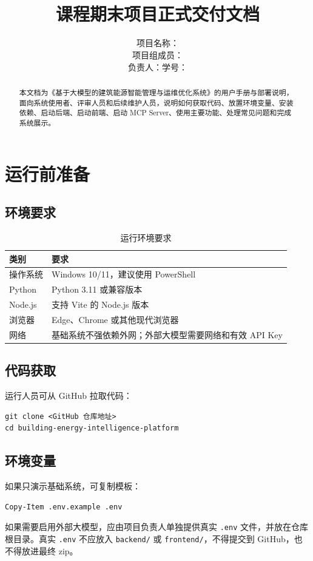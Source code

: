 \documentclass[12pt,a4paper]{ctexart}
\title{
    \vspace{-2em}
    \heiti \zihao{2} \reporttitle \\
    \vspace{1em}
    \zihao{4} 课程期末项目正式交付文档
}
\author{
    \songti \zihao{4}
    项目名称：\projectname \\
    项目组成员：\teamname \\
    负责人：\studentname \quad 学号：\studentid
}
\date{\docdate}
\newcommand{\projectname}{基于大模型的建筑能源智能管理与运维优化系统}
\newcommand{\code}[1]{{\footnotesize\nolinkurl{#1}}}
\begin{document}
\maketitle
\thispagestyle{fancy}

\begin{abstract}
本文档为《\projectname》的用户手册与部署说明，面向系统使用者、评审人员和后续维护人员，说明如何获取代码、放置环境变量、安装依赖、启动后端、启动前端、启动 MCP Server、使用主要功能、处理常见问题和完成系统展示。
\end{abstract}

\tableofcontents
\newpage

\section{运行前准备}
\subsection{环境要求}
\begin{table}[H]
\centering
\caption{运行环境要求}
\begin{tabularx}{\textwidth}{p{4cm}Y}
\toprule
类别 & 要求 \\
\midrule
操作系统 & Windows 10/11，建议使用 PowerShell \\
Python & Python 3.11 或兼容版本 \\
Node.js & 支持 Vite 的 Node.js 版本 \\
浏览器 & Edge、Chrome 或其他现代浏览器 \\
网络 & 基础系统不强依赖外网；外部大模型需要网络和有效 API Key \\
\bottomrule
\end{tabularx}
\end{table}

\subsection{代码获取}
运行人员可从 GitHub 拉取代码：
\begin{verbatim}
git clone <GitHub 仓库地址>
cd building-energy-intelligence-platform
\end{verbatim}

\subsection{环境变量}
如果只演示基础系统，可复制模板：
\begin{verbatim}
Copy-Item .env.example .env
\end{verbatim}
如果需要启用外部大模型，应由项目负责人单独提供真实 \code{.env} 文件，并放在仓库根目录。真实 \code{.env} 不应放入 \code{backend/} 或 \code{frontend/}，不得提交到 GitHub，也不得放进最终 zip。
\end{document}
